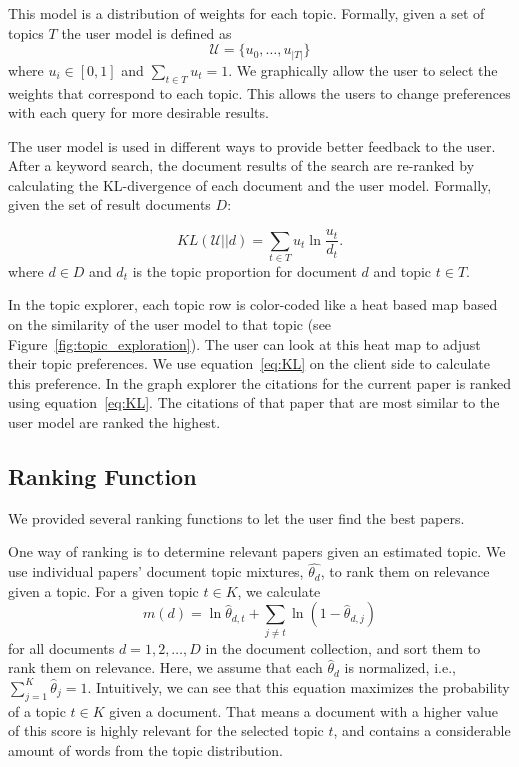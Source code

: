 This model is a distribution of weights for each topic.
Formally, given a set of topics $T$ the user model is defined as
$$
\mathcal{U} = \{u_0, \ldots, u_{|T|}\}
$$
where $u_i \in [0,1]$ and $\sum_{t \in T} u_t = 1$.
We graphically allow the user to select the weights that correspond to
each topic. This allows the users to change preferences with each query
for more desirable results.

The user model is used in different ways to provide better feedback to
the user. After a keyword search, the document results of the search 
are re-ranked by calculating the KL-divergence of each document and the
user model. Formally, given the set of result documents $D$:

\begin{equation} \label{eq:KL}
KL(\mathcal{U}||d) = \sum_{t \in T} u_t \ln \frac{u_t}{d_t}.
\end{equation}
where $d \in D$ and $d_t$ is the topic proportion for document $d$ and
topic $t \in T$. 

In the topic explorer, each topic row is color-coded like a heat 
based map based on the similarity of the user model to that topic (see Figure~\ref{fig:topic_exploration}).
The user can look at this heat map to adjust their topic preferences.
We use equation~\ref{eq:KL} on the client side to calculate this preference. 
In the graph explorer the citations for the current paper is ranked
using equation~\ref{eq:KL}. The citations of that paper that are most
similar to the user model are ranked the highest.


\subsection{Ranking Function}
We provided several ranking functions to let the user find
the best papers.

One way of ranking is to determine relevant papers 
given an estimated topic. We use individual papers'
document topic mixtures, $\hat{\theta_d}$, to rank them 
on relevance given a topic. For a given 
topic $t \in K$, we calculate
\begin{equation}
m(d) = \ln \hat{\theta}_{d,t} + \sum_{j \neq t}{\ln (1 - \hat{\theta}_{d,j})}
\end{equation}
for all documents $d = 1, 2, \ldots, D$ in 
the document collection, and sort them to rank
them on relevance. Here, we assume that
each $\hat{\theta}_d$ is normalized, 
i.e., $\sum_{j=1}^{K}{\hat{\theta}_j} = 1$.
Intuitively, we can see that this equation maximizes the probability
of a topic $t \in K$ given a document.
That means a document with a higher value of this score is 
highly relevant for the selected topic $t$, and contains 
a considerable amount of words from the topic distribution.    





